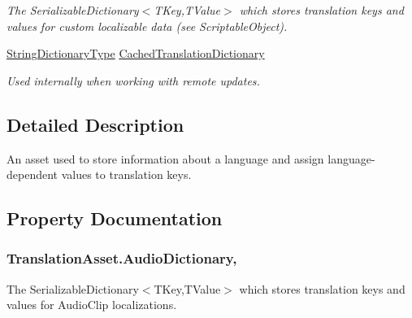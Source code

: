 \begin{DoxyCompactItemize}
\begin{DoxyCompactList}\small\item\em The Serializable\+Dictionary$<$\+T\+Key,\+T\+Value$>$ which stores translation keys and values for custom localizable data (see Scriptable\+Object). \end{DoxyCompactList}\item 
\hyperlink{class_translation_asset_1_1_string_dictionary_type}{String\+Dictionary\+Type} \hyperlink{class_translation_asset_a5a26cba32a5fab09ee1072ea0b626f4a}{Cached\+Translation\+Dictionary}
\begin{DoxyCompactList}\small\item\em Used internally when working with remote updates. \end{DoxyCompactList}\end{DoxyCompactItemize}


\subsection{Detailed Description}
An asset used to store information about a language and assign language-\/dependent values to translation keys. 



\subsection{Property Documentation}
\subsubsection[{\texorpdfstring{Audio\+Dictionary}{AudioDictionary}}]{ Translation\+Asset.\+Audio\+Dictionary\hspace{0.3cm}{\ttfamily [get]}, {\ttfamily [set]}}\hypertarget{class_translation_asset_ab6f5c704931460ca1cf58506a9681c65}{}\label{class_translation_asset_ab6f5c704931460ca1cf58506a9681c65}


The Serializable\+Dictionary$<$\+T\+Key,\+T\+Value$>$ which stores translation keys and values for Audio\+Clip localizations. 

